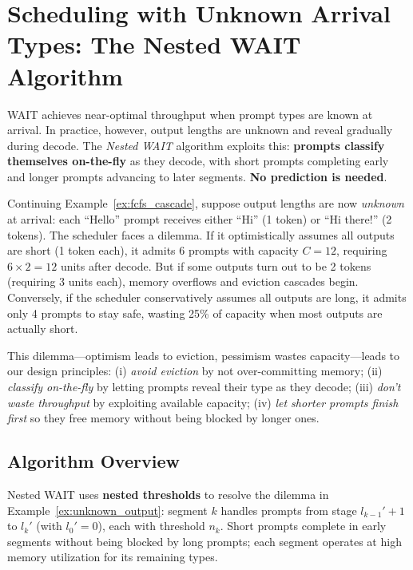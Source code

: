 \section{Scheduling with Unknown Arrival Types: The Nested WAIT Algorithm}
\label{sec:nested_wait}

WAIT achieves near-optimal throughput when prompt types are known at arrival. In practice, however, output lengths are unknown and reveal gradually during decode. The \textit{Nested WAIT} algorithm exploits this: \textbf{prompts classify themselves on-the-fly} as they decode, with short prompts completing early and longer prompts advancing to later segments. \textbf{No prediction is needed}.

\begin{example}
\label{ex:unknown_output}
Continuing Example~\ref{ex:fcfs_cascade}, suppose output lengths are now \emph{unknown} at arrival: each ``Hello'' prompt receives either ``Hi'' (1 token) or ``Hi there!'' (2 tokens). The scheduler faces a dilemma. If it optimistically assumes all outputs are short (1 token each), it admits 6 prompts with capacity $C=12$, requiring $6 \times 2 = 12$ units after decode. But if some outputs turn out to be 2 tokens (requiring 3 units each), memory overflows and eviction cascades begin. Conversely, if the scheduler conservatively assumes all outputs are long, it admits only 4 prompts to stay safe, wasting 25\% of capacity when most outputs are actually short.

This dilemma---optimism leads to eviction, pessimism wastes capacity---leads to our design principles: (i) \emph{avoid eviction} by not over-committing memory; (ii) \emph{classify on-the-fly} by letting prompts reveal their type as they decode; (iii) \emph{don't waste throughput} by exploiting available capacity; (iv) \emph{let shorter prompts finish first} so they free memory without being blocked by longer ones.
\end{example}

\subsection{Algorithm Overview}

Nested WAIT uses \textbf{nested thresholds} to resolve the dilemma in Example~\ref{ex:unknown_output}: segment $k$ handles prompts from stage $l_{k-1}' + 1$ to $l_k'$ (with $l_0' = 0$), each with threshold $n_k$. Short prompts complete in early segments without being blocked by long prompts; each segment operates at high memory utilization for its remaining types.

